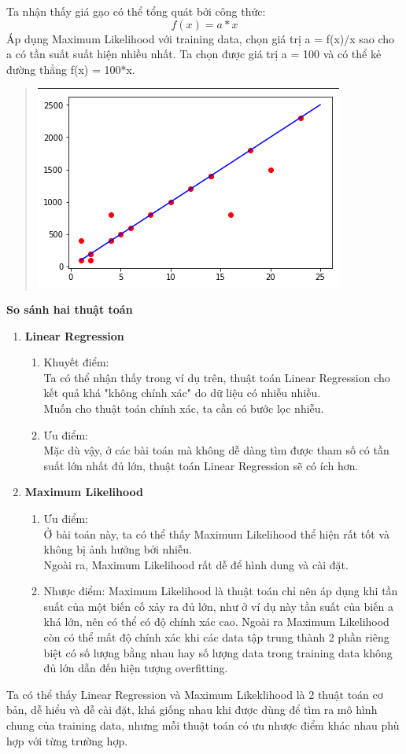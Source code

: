 \documentclass[12pt,letterpaper]{article}
\begin{document}
Ta nhận thấy giá gạo có thể tổng quát bởi công thức:
$$
    f(x) = a*x
$$
Áp dụng Maximum Likelihood với training data, chọn giá trị a = f(x)/x sao cho a có tần suất suất hiện nhiều nhất. Ta chọn được giá trị a = 100 và có thể kẻ đường thẳng f(x) = 100*x.
\begin{quote}
\centering\includegraphics[scale=1]{MaximumLikelihood.png}
\end{quote}

\textbf{So sánh hai thuật toán}
\begin{enumerate}
    \item 
    \textbf{Linear Regression}
    \begin{enumerate}
        \item Khuyết điểm:
        \\ Ta có thể nhận thấy trong ví dụ trên, thuật toán Linear Regression cho kết quả khá "không chính xác" do dữ liệu có nhiễu nhiều.
        \\ Muốn cho thuật toán chính xác, ta cần có bước lọc nhiễu.
        \item Ưu điểm:
        \\ Mặc dù vậy, ở các bài toán mà không dễ dàng tìm được tham số có tần suất lớn nhất đủ lớn, thuật toán Linear Regression sẽ có ích hơn.
    \end{enumerate}
    \item
    \textbf{Maximum Likelihood}
    \begin{enumerate}
        \item Ưu điểm:
        \\Ở bài toán này, ta có thể thấy Maximum Likelihood thể hiện rất tốt và không bị ảnh hưởng bởi nhiễu.
        \\Ngoài ra, Maximum Likelihood rất dễ để hình dung và cài đặt.
        \item Nhược điểm:
        Maximum Likelihood là thuật toán chỉ nên áp dụng khi tần suất của một biến cố xảy ra đủ lớn, như ở ví dụ này tần suất của biến a khá lớn, nên có thể có độ chính xác cao. Ngoài ra Maximum Likelihood còn có thể mất độ chính xác khi các data tập trung thành 2 phần riêng biệt có số lượng bằng nhau hay số lượng data trong training data không đủ lớn dẫn đến hiện tượng overfitting.
    \end{enumerate}
    
\end{enumerate}
Ta có thể thấy Linear Regression và Maximum Likeklihood là 2 thuật toán cơ bản, dễ hiểu và dễ cài đặt, khá giống nhau khi được dùng để tìm ra mô hình chung của training data, nhưng mỗi thuật toán có ưu nhược điểm khác nhau phù hợp với từng trường hợp.
\end{document}
